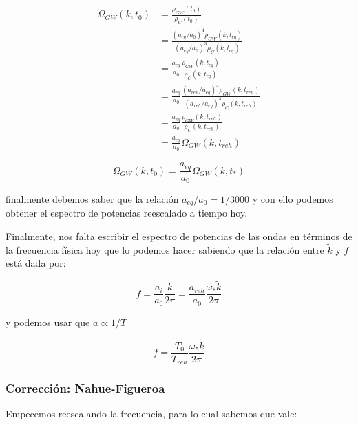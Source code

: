 \begin{equation*}
    \begin{split}
        \Omega_{GW} \left( k, t_0 \right) &= \frac{\rho_{GW} \left( t_0 \right)}{\rho_C \left( t_0 \right)}\\
        &= \frac{(a_{eq}/a_0)^4 \rho_{GW} \left( k, t_{eq} \right)}{(a_{eq}/a_0)^3 \rho_C \left( k, t_{eq} \right)}\\
        &= \frac{a_{eq}}{a_0} \frac{\rho_{GW} \left( k, t_{eq} \right)}{\rho_C \left( k, t_{eq} \right)}\\
        &= \frac{a_{eq}}{a_0} \frac{(a_{reh}/a_{eq})^4 \rho_{GW} \left( k, t_{reh} \right)}{(a_{reh}/a_{eq})^4 \rho_C \left( k, t_{reh} \right)}\\
        &= \frac{a_{eq}}{a_0} \frac{\rho_{GW} \left( k, t_{reh} \right)}{\rho_C \left( k, t_{reh} \right)}\\
        &= \frac{a_{eq}}{a_0} \Omega_{GW} \left( k, t_{reh} \right)
    \end{split}
\end{equation*}

\begin{equation}
    \Omega_{GW} \left( k, t_0 \right) = \frac{a_{eq}}{a_0} \Omega_{GW} \left( k, t_{*} \right)
\end{equation}

\noindent
finalmente debemos saber que la relación $a_{eq}/a_0 = 1/3000$ y con ello podemos obtener el espectro de potencias reescalado a tiempo hoy. 

Finalmente, nos falta escribir el espectro de potencias de las ondas en términos de la frecuencia física hoy que lo podemos hacer sabiendo que la relación entre $\tilde{k}$ y $f$ está dada por:

\begin{equation}
    f = \frac{a_i}{a_0} \frac{k}{2\pi} = \frac{a_{reh}}{a_0} \frac{\omega_* \tilde{k}}{2\pi}
\end{equation}

\noindent
y podemos usar que $a \propto 1/T$

\begin{equation}
    f = \frac{T_{0}}{T_{reh}} \frac{\omega_* \tilde{k}}{2 \pi}
\end{equation}

\subsubsection{Corrección: Nahue-Figueroa}

Empecemos reescalando la frecuencia, para lo cual sabemos que vale:

